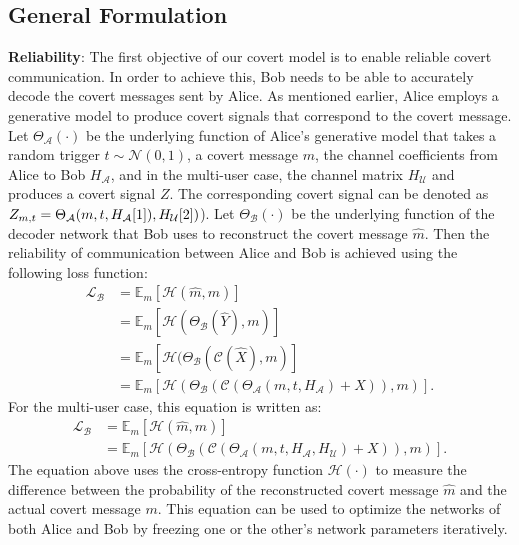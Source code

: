 \subsection{General Formulation}
\textbf{Reliability}: The first objective of our covert model is to enable reliable covert communication. In order to achieve this, Bob needs to be able to accurately decode the covert messages sent by Alice. As mentioned earlier, Alice employs a generative model to produce covert signals that correspond to the covert message. Let \(\Theta_{\mathcal{A}}(\cdot)\) be the underlying function of Alice's generative model that takes a random trigger \(t \sim \mathcal{N}(0, 1)\), a covert message \(m\), the channel coefficients from Alice to Bob \(H_{\mathcal{A}}\), and in the multi-user case, the channel matrix \(H_{\mathcal{U}}\) and produces a covert signal \(Z\). The corresponding covert signal can be denoted as \(Z_{m, t} = \Theta_{\mathcal{A}}(m, t, H_{\mathcal{A}}[1]), H_{\mathcal{U}}[2])\)). Let  \(\Theta_{\mathcal{B}}(\cdot)\) be the underlying function of the decoder network that Bob uses to reconstruct the covert message \(\hat{m}\). Then the reliability of communication between Alice and Bob is achieved using the following loss function:
\begin{equation}
	\begin{aligned} \label{bob_loss}
	\mathcal{L}_{\mathcal{B}} & = \mathbb{E}_{m}[\mathcal{H}(\hat{m}, m)] \\
	& = \mathbb{E}_{m}[\mathcal{H}(\Theta_{\mathcal{B}}(\hat{Y}), m)] \\ 
	& = \mathbb{E}_{m}[\mathcal{H}(\Theta_{\mathcal{B}}(\mathcal{C}(\hat{X}), m)] \\ 
	& = \mathbb{E}_{m}[\mathcal{H}(\Theta_{\mathcal{B}}(\mathcal{C}(\Theta_{\mathcal{A}}(m, t, H_{\mathcal{A}}) + X)), m)].
	\end{aligned}
\end{equation}
For the multi-user case, this equation is written as:
\begin{equation}
	\begin{aligned}
		\mathcal{L}_{\mathcal{B}} & = \mathbb{E}_{m}[\mathcal{H}(\hat{m}, m)] \\
		& = \mathbb{E}_{m}[\mathcal{H}(\Theta_{\mathcal{B}}(\mathcal{C}(\Theta_{\mathcal{A}}(m, t, H_{\mathcal{A}}, H_{\mathcal{U}}) + X)), m)].
	\end{aligned}
\end{equation}
The equation above uses the cross-entropy function \(\mathcal{H}(\cdot)\) to measure the difference between the probability of the reconstructed covert message \(\hat{m}\) and the actual covert message \(m\). This equation can be used to optimize the networks of both Alice and Bob by freezing one or the other's network parameters iteratively.

